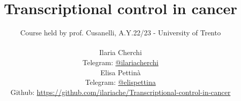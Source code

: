 
\title{\Huge\textbf{Transcriptional control in cancer}}
\author{
 Course held by prof. Cusanelli, A.Y.22/23 - University of Trento\\
  \\
  Ilaria Cherchi\\
  \small Telegram: \href{https://t.me/ilariacherchi}{@ilariacherchi} \\[3pt]
  Elisa Pettin\`a\\
  \small Telegram: \href{https://t.me/elisapettina}{@elispettina} \\[3pt]
\small Github: \href{https://github.com/ilariache/Transcriptional-control-in-cancer}{https://github.com/ilariache/Transcriptional-control-in-cancer}\\}



\maketitle
\tableofcontents

    
    
    
    
    
     
     
    

